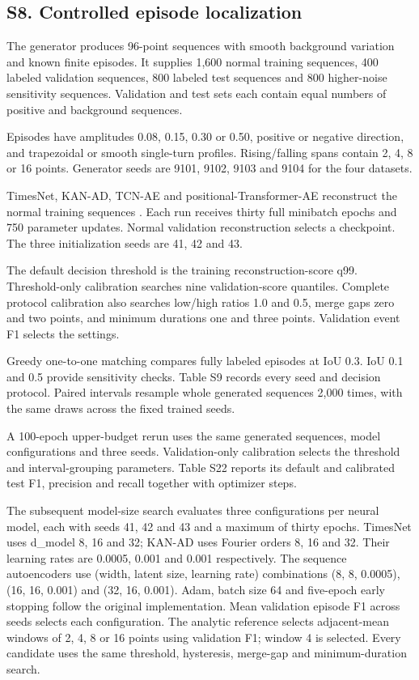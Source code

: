 \documentclass[a4paper,11pt]{article}
\begin{document}
\subsection{S8. Controlled episode localization}\label{s8.-controlled-episode-localization}

The generator produces 96-point sequences with smooth background variation and known finite episodes. It supplies 1,600 normal training sequences, 400 labeled validation sequences, 800 labeled test sequences and 800 higher-noise sensitivity sequences. Validation and test sets each contain equal numbers of positive and background sequences.

Episodes have amplitudes 0.08, 0.15, 0.30 or 0.50, positive or negative direction, and trapezoidal or smooth single-turn profiles. Rising/falling spans contain 2, 4, 8 or 16 points. Generator seeds are 9101, 9102, 9103 and 9104 for the four datasets.

TimesNet, KAN-AD, TCN-AE and positional-Transformer-AE reconstruct the normal training sequences \citep{wu2023timesnet, zhou2025kanad}. Each run receives thirty full minibatch epochs and 750 parameter updates. Normal validation reconstruction selects a checkpoint. The three initialization seeds are 41, 42 and 43.

The default decision threshold is the training reconstruction-score q99. Threshold-only calibration searches nine validation-score quantiles. Complete protocol calibration also searches low/high ratios 1.0 and 0.5, merge gaps zero and two points, and minimum durations one and three points. Validation event F1 selects the settings.

Greedy one-to-one matching compares fully labeled episodes at IoU 0.3. IoU 0.1 and 0.5 provide sensitivity checks. Table S9 records every seed and decision protocol. Paired intervals resample whole generated sequences 2,000 times, with the same draws across the fixed trained seeds.

A 100-epoch upper-budget rerun uses the same generated sequences, model configurations and three seeds. Validation-only calibration selects the threshold and interval-grouping parameters. Table S22 reports its default and calibrated test F1, precision and recall together with optimizer steps.

The subsequent model-size search evaluates three configurations per neural model, each with seeds 41, 42 and 43 and a maximum of thirty epochs. TimesNet uses d\_model 8, 16 and 32; KAN-AD uses Fourier orders 8, 16 and 32. Their learning rates are 0.0005, 0.001 and 0.001 respectively. The sequence autoencoders use (width, latent size, learning rate) combinations (8, 8, 0.0005), (16, 16, 0.001) and (32, 16, 0.001). Adam, batch size 64 and five-epoch early stopping follow the original implementation. Mean validation episode F1 across seeds selects each configuration. The analytic reference selects adjacent-mean windows of 2, 4, 8 or 16 points using validation F1; window 4 is selected. Every candidate uses the same threshold, hysteresis, merge-gap and minimum-duration search.
\end{document}
